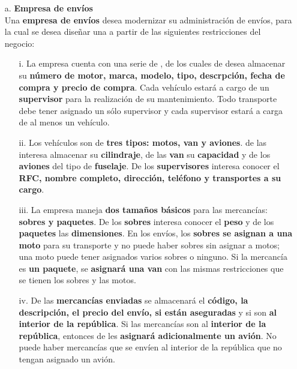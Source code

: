 \documentclass[letterpaper,11pt]{article}
\begin{document}
\begin{itemize}
    \item[a.] \textbf{Empresa de envíos} \\
    Una \textbf{empresa de envíos} desea modernizar su administración de envíos,
    para la cual se desea diseñar una  a partir de las 
    siguientes restricciones del negocio:
    
    \begin{itemize}
        \item[i.] La empresa cuenta con una serie de ,
        de los cuales de desea almacenar su \textbf{número de motor, marca, modelo, 
        tipo, descrpción, fecha de compra y precio de compra}. Cada vehículo estará
        a cargo de un \textbf{supervisor} para la realización de su mantenimiento.
        Todo transporte debe tener asignado un sólo supervisor y cada supervisor 
        estará a carga de al menos un vehículo.
        
        \item[ii.] Los vehículos son de \textbf{tres tipos: motos, van y aviones}. 
        de las  interesa almacenar su \textbf{cilindraje}, de las 
        \textbf{van} su \textbf{capacidad} y de los \textbf{aviones} del tipo de 
        \textbf{fuselaje}. De los \textbf{supervisores} interesa conocer el 
        \textbf{RFC, nombre completo, dirección, teléfono y transportes a su cargo}.
    
        \item[iii.] La empresa maneja \textbf{dos tamaños básicos} para las 
        mercancías: \textbf{sobres y paquetes}. De los \textbf{sobres} interesa 
        conocer el \textbf{peso} y de los \textbf{paquetes} las \textbf{dimensiones}.
        En los envíos, los \textbf{sobres se asignan a una moto} para su 
        transporte y no puede haber sobres sin asignar a motos; una moto puede tener 
        asignados varios sobres o ninguno. Si la mercancía es \textbf{un paquete}, 
        se \textbf{asignará una van} con las mismas restricciones que se tienen los 
        sobres y las motos.
    
        \item[iv.] De las \textbf{mercancías enviadas} se almacenará el 
        \textbf{código, la descripción, el precio del envío, si están aseguradas} y
        si son \textbf{al interior de la república}. Si las mercancías son al 
        \textbf{interior de la república}, entonces de les \textbf{asignará 
        adicionalmente un avión}. No puede haber mercancías que se envíen al interior
        de la república que no tengan asignado un avión.
    

\end{itemize}
\end{itemize}
\end{document}
